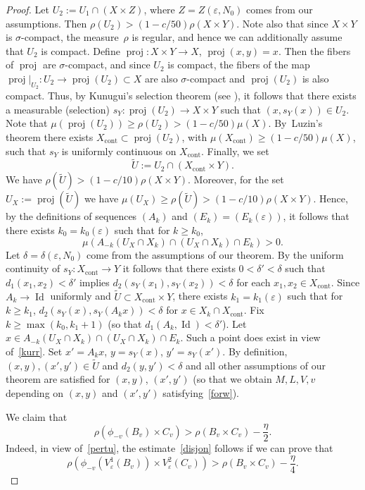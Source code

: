 \documentclass[JEP,XML,SOM,Unicode,NoEqCountersInSection]{cedram}
\let\epsilon\varepsilon
\DeclareMathOperator{\Id}{Id}
\DeclareMathOperator{\proj}{proj}
\newcommand{\cont}{\mathrm{cont}}
\theoremstyle{definition}
\theoremstyle{plain}
\begin{document}
\begin{proof}
Let $U_2:=U_1\cap (X\times Z)$, where $Z=Z(\epsilon,N_0)$ comes from our assumptions. Then $\rho(U_2)>(1-c/50)\rho(X\times Y)$.
Note also that since $X\times Y$ is $\sigma$-compact, the measure~$\rho$ is regular, and hence we can additionally assume that $U_2$ is compact.
Define $\proj:X\times Y\to X$, $\proj(x,y)=x$. Then the fibers of $\proj$ are $\sigma$-compact, and since $U_2$ is compact, the fibers of the map $\proj|_{U_2}:U_2\to \proj(U_2)\subset X$ are also $\sigma$-compact and $\proj(U_2)$ is also compact. Thus, by Kunugui's selection theorem (see \eg \cite[Th.\,4.1]{Ga-Le-Sch}), it follows that there exists a measurable (selection) $s_Y :\proj(U_2)\to X\times Y$ such that $(x,s_Y(x))\in U_2$. Note that $\mu(\proj(U_2))\geq \rho(U_2)>(1-c/50)\mu(X)$. By~Luzin's theorem there exists $X_\cont\subset \proj(U_2)$, with $\mu(X_\cont)\geq (1-c/50)\mu(X)$, such that $s_Y$ is uniformly continuous on $X_\cont$. Finally, we set
\[
\widetilde{U}:=U_2\cap (X_\cont\times Y).
\]
We have $\rho(\widetilde{U})>(1-c/10)\rho(X\times Y)$. Moreover, for the set $U_X:=\proj(\widetilde{U})$ we have
$\mu(U_X)\geq \rho(\widetilde{U})>(1-c/10)\rho(X\times Y)$.
Hence, by the definitions of sequences $(A_k)$ and $(E_k)=(E_k(\epsilon))$, it follows that there exists $k_0=k_0(\epsilon)$ such that for $k\geq k_0$,
\begin{equation}\label{kurr}
\mu(A_{-k}(U_X\cap X_k)\cap (U_X\cap X_k)\cap E_k)>0.
\end{equation}
Let $\delta=\delta(\epsilon,N_0)$ come from the assumptions of our theorem. By the uniform continuity of $s_Y:X_\cont\to Y$ it follows that there exists $0<\delta'<\delta$ such that $d_1(x_1,x_2)<\delta'$ implies $d_2(s_Y(x_1),s_Y(x_2))<\delta$ for each $x_1,x_2\in X_\cont$.
Since $A_k\to \Id$ uniformly
and $\widetilde{U}\subset X_\cont\times Y$, there exists $k_1=k_1(\epsilon)$ such that for $k\geq k_1$, $d_2(s_Y(x),s_Y(A_kx))<\delta$ for $x\in X_k\cap X_\cont$. Fix $k\geq \max(k_0,k_1+1)$ (so that $d_1(A_k,\Id)<\delta'$). Let $x\in A_{-k}(U_X\cap X_k)\cap (U_X\cap X_k)\cap E_k$. Such a point does exist in view of~\eqref{kurr}. Set $x'=A_kx$, $y=s_Y(x)$, $y'=s_Y(x')$. By definition, $(x,y),(x',y')\in \widetilde{U}$ and $d_2(y,y')<\delta$ and all other assumptions of our theorem are satisfied for $(x,y)$, $(x',y')$ (so that we obtain $M,L,V,v$ depending on $(x,y)$ and $(x',y')$ satisfying~\eqref{forw}).

We claim that
\begin{equation}\label{disjon}
\rho(\phi_{-v}(B_v)
\times C_v)>\rho(B_v\times C_v)-\frac{\eta}{2}.
\end{equation}
Indeed, in view of~\eqref{pertu}, the estimate~\eqref{disjon} follows if we can prove that
\[
\rho(\phi_{-v}(V^1_{\epsilon}(B_v))
\times V^2_{\epsilon}(C_v))>\rho(B_v\times C_v)-\frac{\eta}{4}.
\]


\end{proof}
\end{document}
